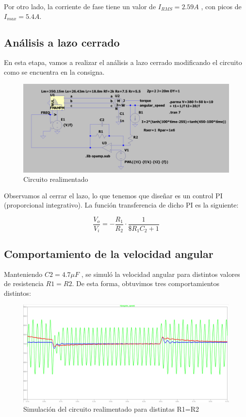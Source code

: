 \documentclass[e4_tp3_main.tex]{subfiles}
\begin{document}
Por otro lado, la corriente de fase tiene un valor de $I_{RMS}=2.59A$ , con picos de $I_{max}=5.4A$. 

\subsection{Análisis a lazo cerrado}
En esta etapa, vamos a realizar el análisis a lazo cerrado modificando el circuito como se encuentra en la consigna.

\begin{figure}[H]
	\centering
	\includegraphics[width=0.7\linewidth]{Imagenes/3-2-circuito.png}
	\caption{Circuito realimentado}
	\label{fig:torq}
\end{figure}


Observamos al cerrar el lazo, lo que tenemos que diseñar es un control PI (proporcional integrativo). La función transferencia de dicho PI es la siguiente:

$$\frac{V_o}{V_i}=-\frac{R_1}{R_2} \cdot \frac{1}{\$ R_1 C_2 + 1} $$

\vspace{0.5cm}

\subsection{Comportamiento de la velocidad angular}

Manteniendo $C2=4.7\mu F$ , se simul\'o la velocidad angular para distintos valores de resistencia $R1=R2$. De esta forma, obtuvimos tres comportamientos distintos:

\begin{figure}[H]
	\centering
	\includegraphics[width=0.8\linewidth]{Imagenes/3-distintosR.png}
	\caption{Simulación del circuito realimentado para distintas R1=R2}
	\label{fig:distintos_r}
\end{figure}
\end{document}
